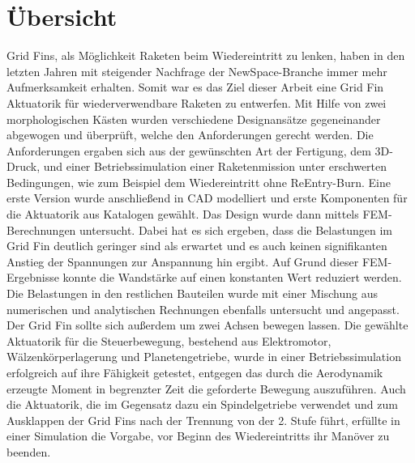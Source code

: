 \chapter*{Übersicht}
Grid Fins, als Möglichkeit Raketen beim Wiedereintritt zu lenken, haben in den letzten Jahren mit steigender Nachfrage der NewSpace-Branche immer mehr Aufmerksamkeit erhalten. Somit war es das Ziel dieser Arbeit eine Grid Fin Aktuatorik für wiederverwendbare Raketen zu entwerfen. Mit Hilfe von zwei morphologischen Kästen wurden verschiedene Designansätze gegeneinander abgewogen und überprüft, welche den Anforderungen gerecht werden. Die Anforderungen ergaben sich aus der gewünschten Art der Fertigung, dem 3D-Druck, und einer Betriebssimulation einer Raketenmission unter erschwerten Bedingungen, wie zum Beispiel dem Wiedereintritt ohne ReEntry-Burn.  Eine erste Version wurde anschließend in CAD modelliert und erste Komponenten für die Aktuatorik aus Katalogen gewählt. Das Design wurde dann mittels FEM-Berechnungen untersucht. Dabei hat es sich ergeben, dass die Belastungen im Grid Fin deutlich geringer sind als erwartet und es auch keinen signifikanten Anstieg der Spannungen zur Anspannung hin ergibt. Auf Grund dieser FEM-Ergebnisse konnte die Wandstärke auf einen konstanten Wert reduziert werden. Die Belastungen in den restlichen Bauteilen wurde mit einer Mischung aus numerischen und analytischen Rechnungen ebenfalls untersucht und angepasst. Der Grid Fin sollte sich außerdem um zwei Achsen bewegen lassen. Die gewählte Aktuatorik für die Steuerbewegung, bestehend aus Elektromotor, Wälzenkörperlagerung und Planetengetriebe, wurde in einer Betriebssimulation erfolgreich auf ihre Fähigkeit getestet, entgegen das durch die Aerodynamik erzeugte Moment in begrenzter Zeit die geforderte Bewegung auszuführen. Auch die Aktuatorik, die im Gegensatz dazu ein Spindelgetriebe verwendet und zum Ausklappen der Grid Fins nach der Trennung von der 2. Stufe führt, erfüllte in einer Simulation die Vorgabe, vor Beginn des Wiedereintritts ihr Manöver zu beenden.